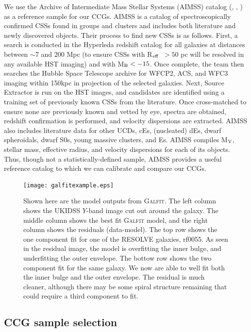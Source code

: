 \documentclass[iop,apj]{emulateapj}
\newcommand{\Reff}{R$_{\rm eff}$}
\begin{document}
\noindent We use the Archive of Intermediate Mass Stellar Systems (AIMSS) catalog (\citet{Norris2014}, \citet{Forbes2014}, \citet{Janz2015}) as a reference sample for our CCGs.  AIMSS is a catalog of spectroscopically confirmed CSSs found in groups and clusters and includes both literature and newly discovered objects. Their process to find new CSSs is as follows. First, a search is conducted in the Hyperleda redshift catalog \citep{Paturel2003} for all galaxies at distances between $\sim 7$ and 200 Mpc (to ensure CSSs with \Reff\ $> 50$ pc will be resolved in any available HST imaging) and with M$_{\rm B} < -15$. Once complete, the team then searches the Hubble Space Telescope archive for WFCP2, ACS, and WFC3 imaging within 150kpc in projection of the selected galaxies. Next, Source Extractor is run on the HST images, and candidates are identified using a training set of previously known CSSs from the literature. Once cross-matched to ensure none are previously known and vetted by eye, spectra are obtained, redshift confirmation is performed, and velocity dispersions are extracted. AIMSS also includes literature data for other UCDs, cEs, (nucleated) dEs, dwarf spheroidals, dwarf S0s, young massive clusters, and Es. AIMSS compiles M$_{\rm V}$, stellar mass, effective radius, and velocity dispersions for each of its objects. Thus, though not a statistically-defined sample, AIMSS provides a useful reference catalog to which we can calibrate and compare our CCGs.

\begin{figure}[b]
\begin{center}
\texttt{[image: galfitexample.eps]}
\caption{Shown here are the model outputs from \textsc{Galfit}. The left column shows the UKIDSS $Y$-band image cut out around the galaxy. The middle column shows the best fit \textsc{Galfit} model, and the right column shows the residuals (data-model). The top row shows the one component fit for one of the RESOLVE galaxies, rf0055. As seen in the residual image, the model is overfitting the inner bulge, and underfitting the outer envelope. The bottow row shows the two component fit for the same galaxy. We now are able to well fit both the inner bulge and the outer envelope. The residual is much cleaner, although there may be some spiral structure remaining that could require a third component to fit.}
\label{fig:galfit}
\end{center}
\end{figure}

\subsection{CCG sample selection}
\end{document}
